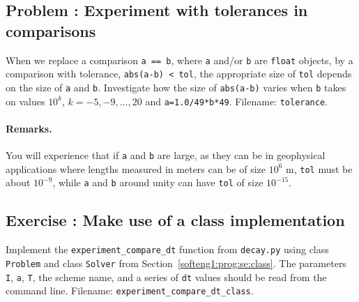 \documentclass[graybox,sectrefs,envcountresetchap,open=right,final]{svmonodo}
\newenvironment{doconceexercise}{}{}
\newcounter{doconceexercisecounter}
\begin{document}
\begin{doconceexercise}

\subsection*{Problem \thedoconceexercisecounter: Experiment with tolerances in comparisons}

\label{softeng1:exer:tol}

When we replace a comparison \texttt{a == b}, where \texttt{a} and/or \texttt{b} are
\texttt{float} objects, by a comparison with tolerance, \texttt{abs(a-b) < tol},
the appropriate size of \texttt{tol} depends on the size of \texttt{a} and \texttt{b}.
Investigate how the size of \texttt{abs(a-b)} varies when \texttt{b} takes on
values $10^k$, $k=-5,-9,\ldots,20$ and \texttt{a=1.0/49*b*49}.
\noindent Filename: \texttt{tolerance}.


\paragraph{Remarks.}
You will experience that if \texttt{a} and \texttt{b} are large, as they can be
in geophysical applications where lengths measured in meters can be of size
$10^6$ m, \texttt{tol} must be about $10^{-9}$, while \texttt{a} and \texttt{b} around unity can
have \texttt{tol} of size $10^{-15}$.


\end{doconceexercise}




\begin{doconceexercise}

\subsection*{Exercise \thedoconceexercisecounter: Make use of a class implementation}

\label{softeng1:exer:class:dts}

Implement the \Verb!experiment_compare_dt! function from \texttt{decay.py}
using class \texttt{Problem} and class \texttt{Solver} from
Section~\ref{softeng1:prog:se:class}.
The parameters \texttt{I}, \texttt{a}, \texttt{T}, the scheme name, and a series of
\texttt{dt} values should be read from the command line.
\noindent Filename: \Verb!experiment_compare_dt_class!.

\end{doconceexercise}
\end{document}
